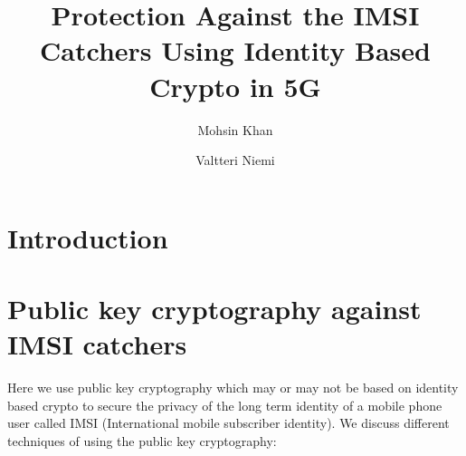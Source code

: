 \documentclass[lnicst,sechang,a4paper]{svmultln}
\begin{document}
\mainmatter  %

\title{Protection Against the IMSI Catchers Using Identity Based Crypto in 5G}


%
%
\author{Mohsin Khan%
\and Valtteri Niemi}  %


%
%

\maketitle


\begin{abstract}

\end{abstract}


\section{Introduction}
\label{intro}  

\section{Public key cryptography against IMSI catchers}
Here we use public key cryptography which may or may not be based on identity based crypto to secure the privacy of the long term identity of a mobile phone user called IMSI (International mobile subscriber identity). We discuss different techniques of using the public key cryptography:
\end{document}
